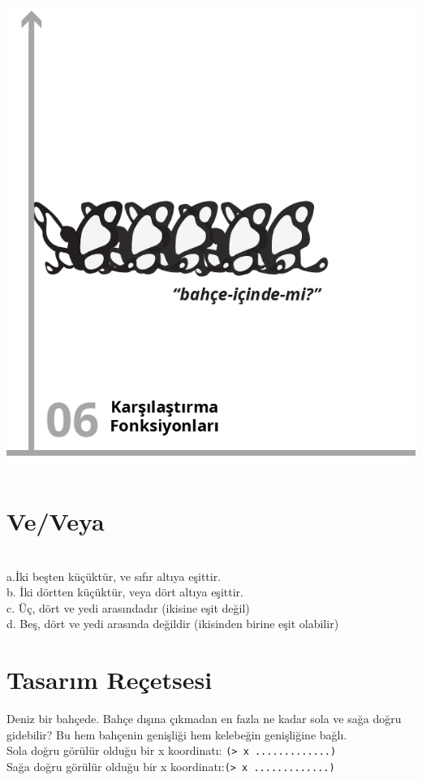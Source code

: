 \documentclass[12pt, a4paper]{article}
\begin{document}
\newpage
\includegraphics[width=1.2\linewidth]{cebir-bolum-06-000.png}
\newpage
\section*{Ve/Veya}
\\[4ex]
a.İki beşten küçüktür, ve sıfır altıya eşittir.\\[30ex]
b. İki dörtten küçüktür, veya dört altıya eşittir.\\[30ex]
c. Üç, dört ve yedi arasındadır (ikisine eşit değil)\\[30ex]
d. Beş,  dört ve yedi arasında değildir (ikisinden birine eşit olabilir)\\[30ex]

\newpage
\section*{Tasarım Reçetsesi}
Deniz  bir bahçede. Bahçe dışına çıkmadan en fazla ne kadar 
sola ve sağa doğru gidebilir? Bu hem bahçenin genişliği hem kelebeğin genişliğine bağlı.\\[6ex]
Sola doğru görülür olduğu bir x koordinatı: \texttt{(>   x                         .............)}\\[6ex]
Sağa doğru görülür olduğu bir x koordinatı:\texttt{(>   x                         .............)}\\[6ex]
\end{document}
